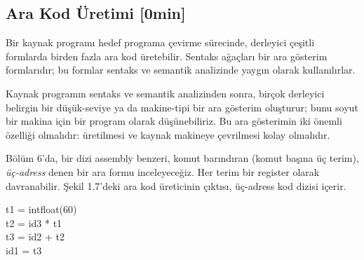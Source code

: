\documentclass{book}
\begin{document}
\subsection{Ara Kod Üretimi [0min]}
Bir kaynak programı hedef programa çevirme sürecinde, derleyici çeşitli formlarda birden fazla ara kod üretebilir. Sentaks ağaçları bir ara gösterim formlarıdır; bu formlar sentaks ve semantik analizinde yaygın olarak kullanılırlar.

Kaynak programın sentaks ve semantik analizinden sonra, birçok derleyici belirgin bir düşük-seviye ya da makine-tipi bir ara gösterim oluşturur; bunu soyut bir makina için bir program olarak düşünebiliriz. Bu ara gösterimin iki önemli özelliği olmalıdır: üretilmesi ve kaynak makineye çevrilmesi kolay olmalıdır.

Bölüm 6'da, bir dizi assembly benzeri, komut barındıran (komut başına üç terim), \textit{üç-adress} denen bir ara formu inceleyeceğiz. Her terim bir register olarak davranabilir. Şekil 1.7'deki ara kod üreticinin çıktısı, üç-adress kod dizisi içerir.

\begin{center}
\begin{flushleft}
t1 = intfloat(60) \\
t2 = id3 * t1\\ 
t3 = id2 + t2\\
id1 = t3
\end{flushleft}
		  
\end{center}
\end{document}
